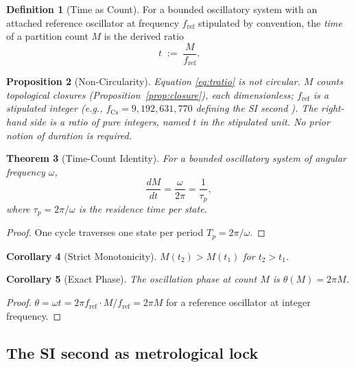 \documentclass[twocolumn,10pt,a4paper]{article}
\theoremstyle{thmstyle}
\newtheorem{theorem}{Theorem}[section]
\newtheorem{proposition}[theorem]{Proposition}
\newtheorem{corollary}[theorem]{Corollary}
\theoremstyle{definition}
\newtheorem{definition}[theorem]{Definition}
\theoremstyle{remark}
\begin{document}
\begin{definition}[Time as Count]
\label{def:tcount}
For a bounded oscillatory system with an attached reference oscillator
at frequency $f_{\mathrm{ref}}$ stipulated by convention, the
\emph{time} of a partition count $M$ is the derived ratio
\begin{equation}
t\;:=\;\frac{M}{f_{\mathrm{ref}}}.
\label{eq:tratio}
\end{equation}
\end{definition}

\begin{proposition}[Non-Circularity]
\label{prop:nocirc}
Equation \eqref{eq:tratio} is not circular. $M$ counts topological
closures (Proposition~\ref{prop:closure}), each dimensionless;
$f_{\mathrm{ref}}$ is a stipulated integer (e.g., $f_{\mathrm{Cs}}=
9{,}192{,}631{,}770$ defining the SI second \citep{si2019}). The
right-hand side is a ratio of pure integers, named $t$ in the
stipulated unit. No prior notion of duration is required.
\end{proposition}

\begin{theorem}[Time-Count Identity]
\label{thm:tc}
For a bounded oscillatory system of angular frequency $\omega$,
\begin{equation}
\boxed{\;\frac{dM}{dt}=\frac{\omega}{2\pi}=\frac{1}{\tau_{p}},\;}
\label{eq:tc}
\end{equation}
where $\tau_{p}=2\pi/\omega$ is the residence time per state.
\end{theorem}

\begin{proof}
One cycle traverses one state per period $T_{p}=2\pi/\omega$.
\end{proof}

\begin{corollary}[Strict Monotonicity]
\label{cor:mono}
$M(t_{2})>M(t_{1})$ for $t_{2}>t_{1}$.
\end{corollary}

\begin{corollary}[Exact Phase]
\label{cor:phase}
The oscillation phase at count $M$ is $\theta(M)=2\pi M$.
\end{corollary}

\begin{proof}
$\theta=\omega t=2\pi f_{\mathrm{ref}}\cdot M/f_{\mathrm{ref}}=2\pi M$
for a reference oscillator at integer frequency.
\end{proof}

\subsection{The SI second as metrological lock}
\end{document}
